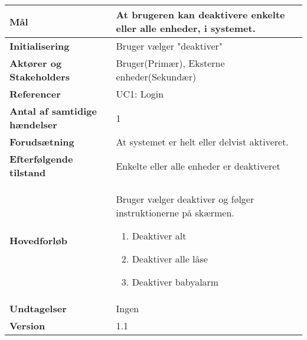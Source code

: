 \begin{table}[H] \centering
\begin{tabular}{|p{6cm}|p{8cm}|}
	\hline
\textbf{Mål}	&
At brugeren kan deaktivere enkelte eller alle enheder, i systemet.
\\\hline
\textbf{Initialisering} &
Bruger vælger "deaktiver"
\\\hline
\textbf{Aktører og Stakeholders}	&
Bruger(Primær), Eksterne enheder(Sekundær)
\\\hline
\textbf{Referencer} &
UC1: Login
\\\hline
\textbf{Antal af samtidige hændelser} &
1
\\\hline
\textbf{Forudsætning} &
At systemet er helt eller delvist aktiveret.
\\\hline
\textbf{Efterfølgende tilstand} &
Enkelte eller alle enheder er deaktiveret
\\\hline
\textbf{Hovedforløb}	&
Bruger vælger deaktiver og følger instruktionerne på skærmen.

\begin{enumerate}
	
	\item Deaktiver alt

	\item Deaktiver alle låse
	
	\item Deaktiver babyalarm
	
\end{enumerate}

\\\hline
\textbf{Undtagelser}	&
Ingen
\\\hline
\textbf{Version}		&1.1 \\\hline
	\end{tabular}
	\label{tab:UC2} 
\end{table}